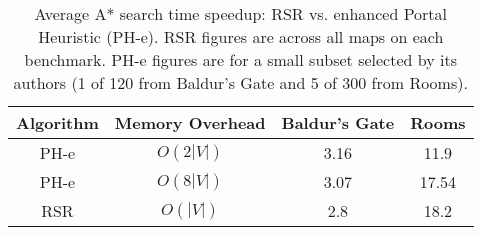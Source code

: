 \begin{table}[tb]
\label{table:phspeedup}
\begin{center}
\begin{tabular}{|c|c|c|c|}
\hline
\textbf{Algorithm} & \textbf{Memory Overhead} & \textbf{Baldur's Gate} & \textbf{Rooms}  \\ \hline
PH-e & $O(2|V|)$ & 3.16 &  11.9 \\ \hline
PH-e & $O(8|V|)$ & 3.07 &  17.54 \\ \hline
RSR & $O(|V|)$ & 2.8 & 18.2 \\ \hline
\end{tabular}
\end{center}
\caption{Average A* search time speedup: RSR vs. enhanced Portal
Heuristic (PH-e). RSR figures are across all maps on each benchmark. PH-e
figures are for a small subset selected by its authors (1 of 120 from
Baldur's Gate and 5 of 300 from Rooms). }
\end{table}
